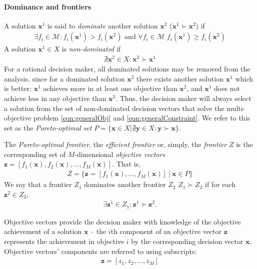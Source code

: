 \paragraph{Dominance and frontiers}
A solution $\mathbf{x}^1$ is said to \textit{dominate} another solution $\mathbf{x}^2$ ($\mathbf{x}^1 \succ \mathbf{x}^2$) if
\begin{align}
\exists f_i \in \mathcal{M} : f_i(\mathbf{x}^1) > f_i(\mathbf{x}^2) \text{ and } \forall f_i \in \mathcal{M} \; f_i(\mathbf{x}^1) \ge f_i(\mathbf{x}^2)
\end{align}
A solution $\mathbf{x}^1 \in X$ is \textit{non-dominated} if
\begin{align}
\nexists \mathbf{x}^2 \in X : \mathbf{x}^2 \succ \mathbf{x}^1
\end{align}
For a rational decision maker, all dominated solutions may be removed from the analysis, since for a dominated solution $\mathbf{x}^2$ there exists another solution $\mathbf{x}^1$ which is better: $\mathbf{x}^1$ achieves more in at least one objective than $\mathbf{x}^2$, and $\mathbf{x}^1$ does not achieve less in any objective than $\mathbf{x}^2$. Thus, the decision maker will always select a solution from the set of non-dominated decision vectors that solve the multi-objective problem \eqref{eqn:generalObj} and \eqref{eqn:generalConstraint}. We refer to this set as the \textit{Pareto-optimal set} $P = \{\mathbf{x} \in X | \nexists \mathbf{y} \in X : \mathbf{y} \succ \mathbf{x} \}$.

The \textit{Pareto-optimal frontier}, the \textit{efficient frontier} or, simply, the \textit{frontier} $Z$ is the corresponding set of $M$-dimensional \textit{objective vectors} $\mathbf{z} = [f_1(\mathbf{x}),f_2(\mathbf{x}),\ldots,f_M(\mathbf{x})]$. That is,
\begin{align}
Z = \{\mathbf{z} = [f_1(\mathbf{x}),\ldots,f_M(\mathbf{x})] \:|\: \mathbf{x} \in P\}
\end{align}
We say that a frontier $Z_1$ dominates another frontier $Z_2$ $Z_1 \succ Z_2$ if for each $\mathbf{z}^2 \in Z_2$,
\begin{align}
\exists \mathbf{z}^1 \in Z_1 : \mathbf{z}^1 \succ \mathbf{z}^2.
\end{align}

Objective vectors provide the decision maker with knowledge of the objective achievement of a solution $\mathbf{x}$ -- the $i$th component of an objective vector $\mathbf{z}$ represents the achievement in objective $i$ by the corresponding decision vector $\mathbf{x}$. Objective vectors' components are referred to using subscripts:
\begin{align}
\mathbf{z} = [z_1, z_2, \ldots, z_M]
\end{align}

